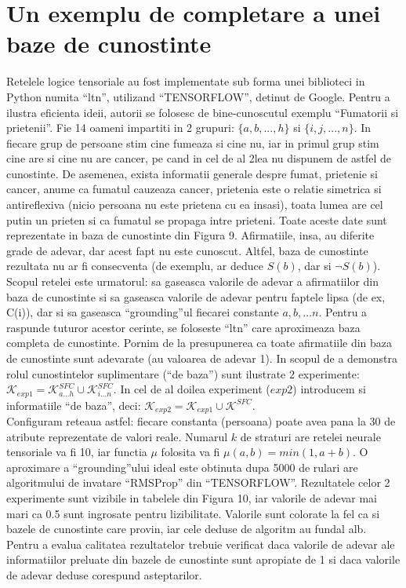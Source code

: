 \documentclass{article}
\begin{document}
\section{Un exemplu de completare a unei baze de cunostinte}
Retelele logice tensoriale au fost implementate sub forma unei biblioteci in Python numita ``ltn'', utilizand ``TENSORFLOW'', detinut de Google. Pentru a ilustra eficienta ideii, autorii se folosesc de bine-cunoscutul exemplu ``Fumatorii si prietenii''. Fie 14 oameni impartiti in 2 grupuri: $\{ a, b, ..., h\}$ si $\{ i, j, ..., n \}$. In fiecare grup de persoane stim cine fumeaza si cine nu, iar in primul grup stim cine are si cine nu are cancer, pe cand in cel de al 2lea nu dispunem de astfel de cunostinte. De asemenea, exista informatii generale despre fumat, prietenie si cancer, anume ca fumatul cauzeaza cancer, prietenia este o relatie simetrica si antireflexiva (nicio persoana nu este prietena cu ea insasi), toata lumea are cel putin un prieten si ca fumatul se propaga intre prieteni. Toate aceste date sunt reprezentate in baza de cunostinte din Figura 9. Afirmatiile, insa, au diferite grade de adevar, dar acest fapt nu este cunoscut. Altfel, baza de cunostinte rezultata nu ar fi consecventa (de exemplu, ar deduce $S(b)$, dar si $\neg S(b)$). Scopul retelei este urmatorul: sa gaseasca valorile de adevar a afirmatiilor din baza de cunostinte si sa gaseasca valorile de adevar pentru faptele lipsa (de ex, C(i)), dar si sa gaseasca ``grounding''ul fiecarei constante $a, b, ...n$. Pentru a raspunde tuturor acestor cerinte, se foloseste ``ltn'' care aproximeaza baza completa de cunostinte. Pornim de la presupunerea ca toate afirmatiile din baza de cunostinte sunt adevarate (au valoarea de adevar 1). In scopul de a demonstra rolul cunostintelor suplimentare (``de baza'') sunt ilustrate 2 experimente: $\mathcal{K}_{exp1} = \mathcal{K}_{a...h}^{SFC} \cup \mathcal{K}_{i...n}^{SFC}$. In cel de al doilea experiment ($exp2$) introducem si informatiile ``de baza'', deci: $\mathcal{K}_{exp2} = \mathcal{K}_{exp1} \cup \mathcal{K}^{SFC}$.\\
Configuram reteaua astfel: fiecare constanta (persoana) poate avea pana la 30 de atribute reprezentate de valori reale. Numarul $k$ de straturi are retelei neurale tensoriale va fi 10, iar functia $\mu$ folosita va fi $\mu(a, b) = min(1, a + b)$. O aproximare a ``grounding''ului ideal este obtinuta dupa 5000 de rulari are algoritmului de invatare ``RMSProp'' din ``TENSORFLOW''. Rezultatele celor 2 experimente sunt vizibile in tabelele din Figura 10, iar valorile de adevar mai mari ca 0.5 sunt ingrosate pentru lizibilitate. Valorile sunt colorate la fel ca si bazele de cunostinte care provin, iar cele deduse de algoritm au fundal alb. Pentru a evalua calitatea rezultatelor trebuie verificat daca valorile de adevar ale informatiilor preluate din bazele de cunostinte sunt apropiate de 1 si daca valorile de adevar deduse corespund asteptarilor.\\
\end{document}
